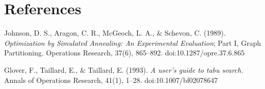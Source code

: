 \section{References}

\begin{thebibliography}{999}

 Johnson, D. S., Aragon, C. R., McGeoch, L. A., \& Schevon, C. (1989). \emph{Optimization by Simulated Annealing: An Experimental Evaluation}; Part I, Graph Partitioning. Operations Research, 37(6), 865–892. doi:10.1287/opre.37.6.865

 Glover, F., Taillard, E., \& Taillard, E. (1993). \emph{A user’s guide to tabu search.} Annals of Operations Research, 41(1), 1–28. doi:10.1007/bf02078647

\end{thebibliography}

\newpage
